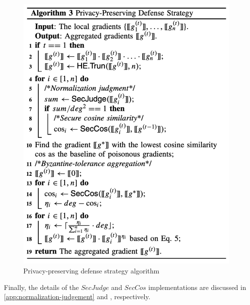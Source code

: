 \begin{figure}[htb]
\centering
  \includegraphics[width=0.8\linewidth]{resources/privacy-preserving-defense-strategy-algo.pdf}
  \caption{Privacy-preserving defense strategy algorithm}
  \label{fig:privacy-preserving-defense-strategy-algo}
\end{figure}

Finally, the details of the $SecJudge$ and $SecCos$ implementations are discussed in \cref{app:normalization-judgement} and , respectively.
